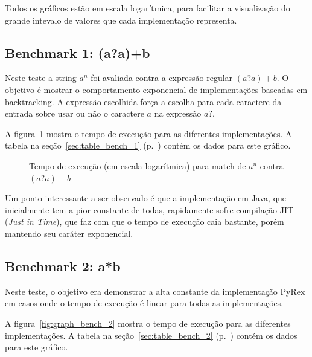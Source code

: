 \documentclass[a4paper,12pt,oneside,onecolumn]{uerj}
\begin{document}
Todos os gráficos estão em escala logarítmica, para facilitar a visualização do grande intevalo de valores que cada implementação representa.

\subsection{Benchmark 1: (a?a)+b}

Neste teste a string $a^n$ foi avaliada contra a expressão regular $(a?a)+b$. O objetivo é mostrar o comportamento exponencial de implementações baseadas em backtracking. A expressão escolhida força a escolha para cada caractere da entrada sobre usar ou não o caractere $a$ na expressão $a?$. 

A figura~\ref{fig:graph_bench_1} mostra o tempo de execução para as diferentes implementações. A tabela na seção~\ref{sec:table_bench_1} (p.~\pageref{sec:table_bench_1}) contém os dados para este gráfico.

\begin{figure}[!htbp]
\centering
{}
\caption{Tempo de execução (em escala logarítmica) para match de $a^n$ contra $(a?a)+b$}
\label{fig:graph_bench_1}
\end{figure}

Um ponto interessante a ser observado é que a implementação em Java, que inicialmente tem a pior constante de todas, rapidamente sofre compilação JIT (\emph{Just in Time}), que faz com que o tempo de execução caia bastante, porém mantendo seu caráter exponencial.

\subsection{Benchmark 2: a*b}

Neste teste, o objetivo era demonstrar a alta constante da implementação PyRex em casos onde o tempo de execução é linear para todas as implementações.

A figura~\ref{fig:graph_bench_2} mostra o tempo de execução para as diferentes implementações. A tabela na seção~\ref{sec:table_bench_2} (p.~\pageref{sec:table_bench_2}) contém os dados para este gráfico.
\end{document}
